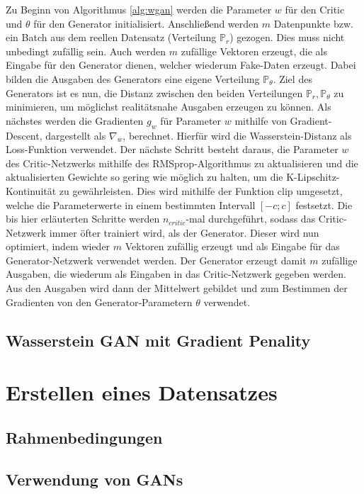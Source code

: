 \documentclass{hsflensburg}
\begin{document}
  Zu Beginn von Algorithmus \ref{alg:wgan} werden die Parameter $w$ für den
  Critic und $\theta$ für den Generator initialisiert. Anschließend werden $m$
  Datenpunkte bzw. ein Batch aus dem reellen Datensatz (Verteilung
  $\mathbb{P}_r$) gezogen. Dies muss nicht unbedingt zufällig sein. Auch werden
  $m$ zufällige Vektoren erzeugt, die als Eingabe für den Generator dienen,
  welcher wiederum Fake-Daten erzeugt. Dabei bilden die Ausgaben des Generators
  eine eigene Verteilung $\mathbb{P}_\theta$. Ziel des Generators ist es nun,
  die Distanz zwischen den beiden Verteilungen $\mathbb{P}_r, \mathbb{P}_\theta$
  zu minimieren, um möglichst realitätsnahe Ausgaben erzeugen zu können. Als
  nächstes werden die Gradienten $g_w$ für Parameter $w$ mithilfe von
  Gradient-Descent, dargestellt als $\nabla_w$, berechnet. Hierfür wird die
  Wasserstein-Distanz als Loss-Funktion verwendet. Der nächste Schritt besteht
  daraus, die Parameter $w$ des Critic-Netzwerks mithilfe des
  RMSprop-Algorithmus zu aktualisieren und die aktualisierten Gewichte so gering
  wie möglich zu halten, um die K-Lipschitz-Kontinuität zu gewährleisten. Dies
  wird mithilfe der Funktion $\mathrm{clip}$ umgesetzt, welche die
  Parameterwerte in einem bestimmten Intervall $\left[-c; c\right]$ festsetzt.
  Die bis hier erläuterten Schritte werden $n_{critic}$-mal durchgeführt, sodass
  das Critic-Netzwerk immer öfter trainiert wird, als der Generator. Dieser wird
  nun optimiert, indem wieder $m$ Vektoren zufällig erzeugt und als Eingabe für
  das Generator-Netzwerk verwendet werden. Der Generator erzeugt damit $m$
  zufällige Ausgaben, die wiederum als Eingaben in das Critic-Netzwerk gegeben
  werden. Aus den Ausgaben wird dann der Mittelwert gebildet und zum Bestimmen
  der Gradienten von den Generator-Parametern $\theta$ verwendet.

  \section{Wasserstein GAN mit Gradient Penality}

  \chapter{Erstellen eines Datensatzes}
  \section{Rahmenbedingungen}
  \section{Verwendung von GANs}
\end{document}
